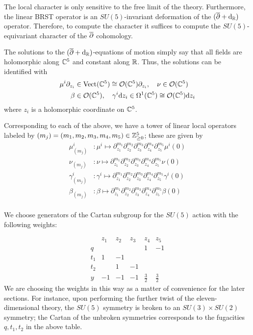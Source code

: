The local character is only sensitive to the free limit of the theory.
Furthermore, the linear BRST operator is an $SU(5)$-invariant deformation of the $(\overline{\partial} + {\rm d}_{\mathbb R})$ operator. 
Therefore, to compute the character it suffices to compute the $SU(5)$-equivariant character of the $\overline{\partial}$ cohomology. 

The solutions to the $(\overline{\partial} + {\rm d}_{\mathbb R})$-equations of motion simply say that all fields are holomorphic along $\mathbb C^5$ and constant along $\mathbb R$. 
Thus, the solutions can be identified with 
\begin{align*}
\mu^{i}\partial_{z_i} & \in {\rm Vect}(\mathbb C^5) \cong \mathcal O(\mathbb{C}^5)\partial_{z_i},\quad 
\nu \in \mathcal O (\mathbb{C}^5) \\
\beta & \in \mathcal O (\mathbb{C}^5), \quad \gamma^{i} {\rm d} z_i \in \Omega^{1}(\mathbb C^5) \cong \mathcal O (\mathbb{C}^5){\rm d} z_i 
\end{align*}
where $z_i$ is a holomorphic coordinate on $\mathbb C^5$. 

Corresponding to each of the above, we have a tower of linear local operators labeled by $(m_j) = (m_1, m_2, m_3, m_4, m_5)\in \mathbb{Z}^5_{\geq 0}$; these are given by
\begin{align*}
 \mu^{i}_{(m_j)} &: \mu^{i}\mapsto \partial_{z_1}^{m_1}\partial_{z_2}^{m_2}\partial_{z_3}^{m_3}\partial_{z_4}^{m_4}\partial_{z_5}^{m_5}\mu^{i} (0) \\
\nu_{(m_j)} &: \nu\mapsto \partial_{z_1}^{m_1}\partial_{z_2}^{m_2}\partial_{z_3}^{m_3}\partial_{z_4}^{m_4}\partial_{z_5}^{m_5}\nu (0) \\
\gamma^{i}_{(m_j)} &: \gamma^{i}\mapsto \partial_{z_1}^{m_1}\partial_{z_2}^{m_2}\partial_{z_3}^{m_3}\partial_{z_4}^{m_4}\partial_{z_5}^{m_5}\gamma^{i} (0) \\
 \beta_{(m_j)} &: \beta\mapsto \partial_{z_1}^{m_1}\partial_{z_2}^{m_2}\partial_{z_3}^{m_3}\partial_{z_4}^{m_4}\partial_{z_5}^{m_5}\beta (0) \\
\end{align*}

\iffalse
We choose generators of the Cartan subgroup for the $SU(5)$ action with the following weights:

\[\begin{array}{|c|c|c|c|c|c|}
& z_1 & z_2 & z_3 & z_4 & z_5 \\
\hline
q & & & & 1 & -1 \\
t_1 & 1 & -1 & & & \\
t_2 & & 1 & -1 & & \\
y & -1 & -1 & -1 &\frac 3 2 & \frac 3 2
\end{array}\]
We are choosing the weights in this way as a matter of convenience for the later sections. 
For instance, upon performing the further twist of the eleven-dimensional theory, the $SU(5)$ symmetry is broken to an $SU(3)\times SU(2)$ symmetry; the Cartan of the unbroken symmetries corresponds to the fugacities $q, t_1, t_2$ in the above table. 

